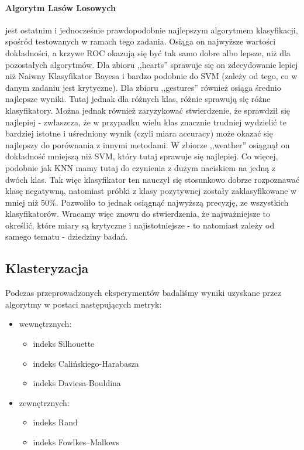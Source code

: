 \documentclass{classrep}
\begin{document}
{{            \paragraph{Algorytm Lasów Losowych} jest ostatnim i jednocześnie prawdopodobnie najlepszym algorytmem klasyfikacji, spośród testowanych w ramach tego zadania. Osiąga on najwyższe wartości dokładności, a krzywe ROC okazują się być tak samo dobre albo lepsze, niż dla pozostałych algorytmów. Dla zbioru ,,hearts'' sprawuje się on zdecydowanie lepiej niż Naiwny Klasyfikator Bayesa i bardzo podobnie do SVM (zależy od tego, co w danym zadaniu jest krytyczne). Dla zbioru ,,gestures'' również osiąga średnio najlepsze wyniki. Tutaj jednak dla różnych klas, różnie sprawują się różne klasyfikatory. Można jednak również zaryzykować stwierdzenie, że sprawdził się najlepiej - zwłaszcza, że w przypadku wielu klas znacznie trudniej wydzielić te bardziej istotne i uśredniony wynik (czyli miara accuracy) może okazać się najlepszy do porównania z innymi metodami. W zbiorze ,,weather'' osiągnął on dokładność mniejszą niż SVM, który tutaj sprawuje się najlepiej. Co więcej, podobnie jak KNN mamy tutaj do czynienia z dużym naciskiem na jedną z dwóch klas. Tak więc klasyfikator ten nauczył się stosunkowo dobrze rozpoznawać klasę negatywną, natomiast próbki z klasy pozytywnej zostały zaklasyfikowane w mniej niż 50\%. Pozwoliło to jednak osiągnąć najwyższą precyzję, ze wszystkich klasyfikatorów. Wracamy więc znowu do stwierdzenia, że najważniejsze to określić, które miary są krytyczne i najistotniejsze - to natomiast zależy od samego tematu - dziedziny badań.
        }

        \subsection{Klasteryzacja}
        \label{summary:clustering} {
            Podczas przeprowadzonych eksperymentów badaliśmy wyniki uzyskane przez algorytmy w postaci następujących metryk:
            \begin{itemize}
                \item wewnętrznych: \begin{itemize}
                    \item indeks Silhouette
                    \item indeks Calińskiego-Harabasza
                    \item indeks Daviesa-Bouldina
                \end{itemize}
                \item zewnętrznych: \begin{itemize}
                    \item indeks Rand
                    \item indeks Fowlkes–Mallows
                \end{itemize}
            \end{itemize}
            
}}
\end{document}
